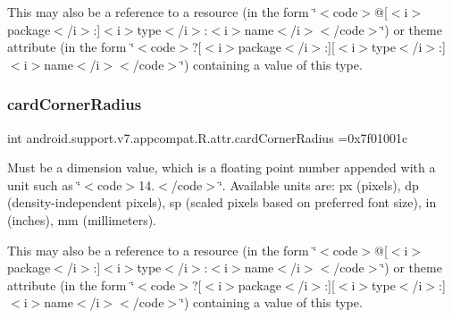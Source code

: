 This may also be a reference to a resource (in the form \char`\"{}$<$code$>$@\mbox{[}$<$i$>$package$<$/i$>$\+:\mbox{]}$<$i$>$type$<$/i$>$\+:$<$i$>$name$<$/i$>$$<$/code$>$\char`\"{}) or theme attribute (in the form \char`\"{}$<$code$>$?\mbox{[}$<$i$>$package$<$/i$>$\+:\mbox{]}\mbox{[}$<$i$>$type$<$/i$>$\+:\mbox{]}$<$i$>$name$<$/i$>$$<$/code$>$\char`\"{}) containing a value of this type. \mbox{\label{classandroid_1_1support_1_1v7_1_1appcompat_1_1R_1_1attr_a99165bfd49949d6d8a5a78d2f2b26956}} 
\subsubsection{\texorpdfstring{card\+Corner\+Radius}{cardCornerRadius}}
{\footnotesize\ttfamily int android.\+support.\+v7.\+appcompat.\+R.\+attr.\+card\+Corner\+Radius =0x7f01001c\hspace{0.3cm}{\ttfamily [static]}}

Must be a dimension value, which is a floating point number appended with a unit such as \char`\"{}$<$code$>$14.\+5sp$<$/code$>$\char`\"{}. Available units are\+: px (pixels), dp (density-\/independent pixels), sp (scaled pixels based on preferred font size), in (inches), mm (millimeters). 

This may also be a reference to a resource (in the form \char`\"{}$<$code$>$@\mbox{[}$<$i$>$package$<$/i$>$\+:\mbox{]}$<$i$>$type$<$/i$>$\+:$<$i$>$name$<$/i$>$$<$/code$>$\char`\"{}) or theme attribute (in the form \char`\"{}$<$code$>$?\mbox{[}$<$i$>$package$<$/i$>$\+:\mbox{]}\mbox{[}$<$i$>$type$<$/i$>$\+:\mbox{]}$<$i$>$name$<$/i$>$$<$/code$>$\char`\"{}) containing a value of this type. \mbox{\label{classandroid_1_1support_1_1v7_1_1appcompat_1_1R_1_1attr_a2ab5dc49d1af3f3feb3a8a8a1c587ae0}} 
